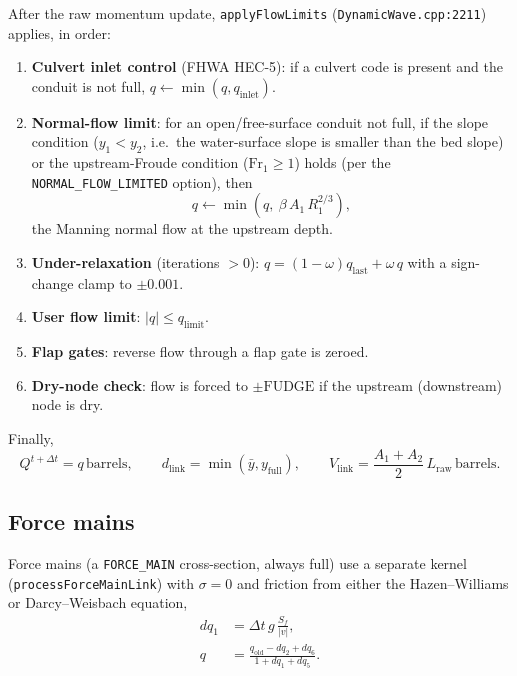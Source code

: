 \documentclass[11pt,a4paper]{article}
\begin{document}
After the raw momentum update, \texttt{applyFlowLimits}
(\texttt{DynamicWave.cpp:2211}) applies, in order:
\begin{enumerate}[nosep]
  \item \textbf{Culvert inlet control} (FHWA HEC-5): if a culvert code is
        present and the conduit is not full, $q \leftarrow \min(q, q_{\mathrm{inlet}})$.
  \item \textbf{Normal-flow limit}: for an open/free-surface conduit not full,
        if the slope condition ($y_1 < y_2$, i.e.\ the water-surface slope is
        smaller than the bed slope) or the upstream-Froude condition
        ($\mathrm{Fr}_1 \ge 1$) holds (per the \texttt{NORMAL\_FLOW\_LIMITED}
        option), then
        \begin{equation}
          q \leftarrow \min\!\left(q,\ \beta\,A_1\,R_1^{2/3}\right),
        \end{equation}
        the Manning normal flow at the upstream depth.
  \item \textbf{Under-relaxation} (iterations $> 0$):
        $q = (1-\omega)q_{\mathrm{last}} + \omega\,q$ with a sign-change clamp
        to $\pm 0.001$.
  \item \textbf{User flow limit}: $\lvert q \rvert \le q_{\mathrm{limit}}$.
  \item \textbf{Flap gates}: reverse flow through a flap gate is zeroed.
  \item \textbf{Dry-node check}: flow is forced to $\pm \mathrm{FUDGE}$ if the
        upstream (downstream) node is dry.
\end{enumerate}
Finally,
\begin{equation}
  Q^{t+\Delta t} = q\,\mathrm{barrels}, \qquad
  d_{\mathrm{link}} = \min(\bar y, y_{\mathrm{full}}), \qquad
  V_{\mathrm{link}} = \frac{A_1 + A_2}{2}\,L_{\mathrm{raw}}\,\mathrm{barrels}.
\end{equation}

\subsection{Force mains}

Force mains (a \texttt{FORCE\_MAIN} cross-section, always full) use a separate
kernel (\texttt{process\-Force\-Main\-Link}) with $\sigma = 0$ and friction
from either the Hazen--Williams or Darcy--Weisbach equation,
\begin{equation}
  \begin{aligned}
    dq_1 &= \Delta t\, g\, \frac{S_f}{\lvert v \rvert},\\
    q &= \frac{q_{\mathrm{old}} - dq_2 + dq_6}{1 + dq_1 + dq_5}.
  \end{aligned}
\end{equation}
\end{document}
